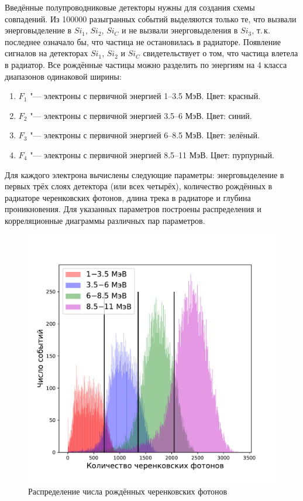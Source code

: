 \documentclass[12pt,a4paper]{report} %
\begin{document}
Введённые полупроводниковые детекторы нужны для создания схемы совпадений. Из 100000 разыгранных событий выделяются только те, что вызвали энерговыделение в $Si_1$, $Si_2$, $Si_C$ и не вызвали энерговыделения в $Si_3$, т.\,к. последнее означало бы, что частица не остановилась в радиаторе. Появление сигналов на детекторах $Si_1$, $Si_2$ и $Si_C$ свидетельствует о том, что частица влетела в радиатор. 
Все рождённые частицы можно разделить по энергиям на 4 класса диапазонов одинаковой ширины:
\begin{enumerate}
	\item $F_1$ "--- электроны с первичной энергией 1--3.5 МэВ. Цвет: красный.
	\item $F_2$ "--- электроны с первичной энергией 3.5--6 МэВ. Цвет: синий.
	\item $F_3$ "--- электроны с первичной энергией 6--8.5 МэВ. Цвет: зелёный.
	\item $F_4$ "--- электроны с первичной энергией 8.5--11 МэВ. Цвет: пурпурный.
\end{enumerate}
Для каждого электрона вычислены следующие параметры: энерговыделение в первых трёх слоях детектора (или всех четырёх), количество рождённых в радиаторе черенковских фотонов, длина трека в радиаторе и глубина проникновения. Для указанных параметров построены распределения и корреляционные диаграммы различных пар параметров. 
\begin{figure}[th!]
	\begin{center}
		\includegraphics[scale=0.5]{pictures/GEANT/CerenkovPhotonsHist.pdf}
	\caption{Распределение числа рождённых черенковских фотонов}
	\label{fig:CerHist}
	\end{center}
\end{figure}
\end{document}
